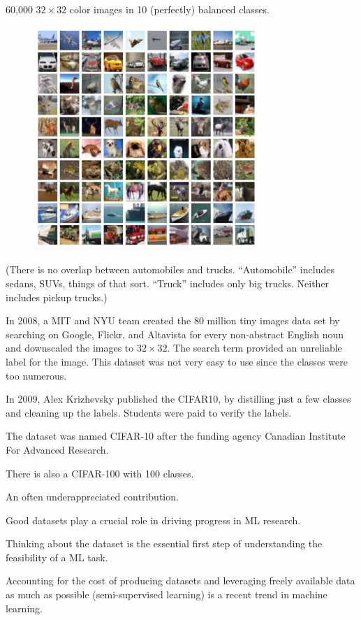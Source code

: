 \begin{concept}[3.21][CIFAR10]
    60,000 $32 \times 32$ color images in 10 (perfectly) balanced classes.

    \begin{figure}[H]
        \centering
        \includegraphics[width=0.75\textwidth]{.././assets/3.4.jpg}
    \end{figure}

    (There is no overlap between automobiles and trucks. “Automobile” includes sedans, SUVs, things of that sort. “Truck” includes only big trucks. Neither includes pickup trucks.)

    In 2008, a MIT and NYU team created the 80 million tiny images data set by searching on Google, Flickr, and Altavista for every non-abstract English noun and downscaled the images to $32 \times 32$. The search term provided an unreliable label for the image. This dataset was not very easy to use since the classes were too numerous.

    In 2009, Alex Krizhevsky published the CIFAR10, by distilling just a few classes and cleaning up the labels. Students were paid to verify the labels.

    The dataset was named CIFAR-10 after the funding agency Canadian Institute For Advanced Research.

    There is also a CIFAR-100 with 100 classes.
\end{concept}

\begin{concept}
    An often underappreciated contribution.

    Good datasets play a crucial role in driving progress in ML research.

    Thinking about the dataset is the essential first step of understanding the feasibility of a ML task.

    Accounting for the cost of producing datasets and leveraging freely available data as much as possible (semi-supervised learning) is a recent trend in machine learning.
\end{concept}
